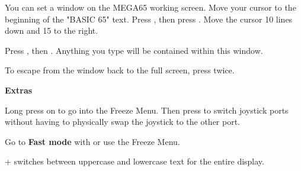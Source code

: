 You can set a window on the MEGA65 working screen. Move your cursor to the beginning of the "BASIC 65" text. Press , then press . Move the cursor 10 lines down and 15 to the right.

Press , then . Anything you type will be contained within this window.

To escape from the window back to the full screen, press  twice.


\textbf{Extras}

Long press on  to go into the Freeze Menu.  Then press  to switch joystick ports without having to physically swap the joystick to the other port.

Go to \textbf{Fast mode} with  or use the Freeze Menu.

\megasymbolkey +  switches between uppercase and lowercase text for the entire display.
